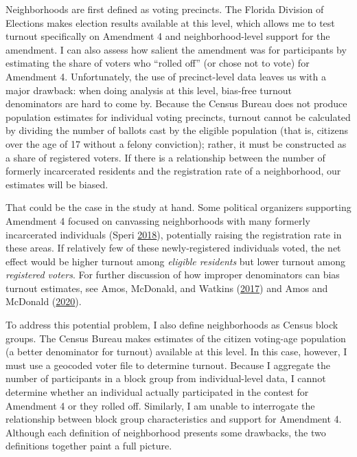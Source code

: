 \documentclass[
  12pt,
]{article}
\begin{document}
Neighborhoods are first defined as voting precincts. The Florida Division of Elections makes election results available at this level, which allows me to test turnout specifically on Amendment 4 and neighborhood-level support for the amendment. I can also assess how salient the amendment was for participants by estimating the share of voters who ``rolled off'' (or chose not to vote) for Amendment 4. Unfortunately, the use of precinct-level data leaves us with a major drawback: when doing analysis at this level, bias-free turnout denominators are hard to come by. Because the Census Bureau does not produce population estimates for individual voting precincts, turnout cannot be calculated by dividing the number of ballots cast by the eligible population (that is, citizens over the age of 17 without a felony conviction); rather, it must be constructed as a share of registered voters. If there is a relationship between the number of formerly incarcerated residents and the registration rate of a neighborhood, our estimates will be biased.

That could be the case in the study at hand. Some political organizers supporting Amendment 4 focused on canvassing neighborhoods with many formerly incarcerated individuals (Speri \protect\hyperlink{ref-Speri2018}{2018}), potentially raising the registration rate in these areas. If relatively few of these newly-registered individuals voted, the net effect would be higher turnout among \emph{eligible residents} but lower turnout among \emph{registered voters}. For further discussion of how improper denominators can bias turnout estimates, see Amos, McDonald, and Watkins (\protect\hyperlink{ref-Amos2017}{2017}) and Amos and McDonald (\protect\hyperlink{ref-Amos2020}{2020}).

To address this potential problem, I also define neighborhoods as Census block groups. The Census Bureau makes estimates of the citizen voting-age population (a better denominator for turnout) available at this level. In this case, however, I must use a geocoded voter file to determine turnout. Because I aggregate the number of participants in a block group from individual-level data, I cannot determine whether an individual actually participated in the contest for Amendment 4 or they rolled off. Similarly, I am unable to interrogate the relationship between block group characteristics and support for Amendment 4. Although each definition of neighborhood presents some drawbacks, the two definitions together paint a full picture.
\end{document}
